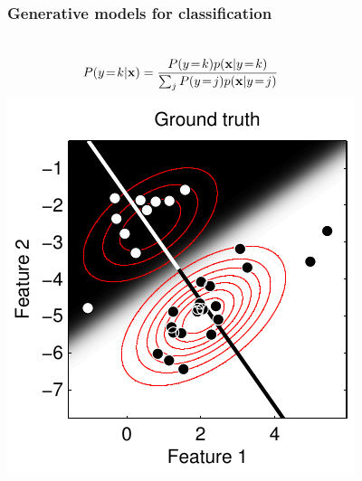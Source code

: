 
\begin{frame}
\frametitle{Generative models for classification}
\begin{columns}[c]
\begin{align*}
P(y\!=\!k|{\bf x}) = \frac{P(y\!=\!k) p({\bf x}|y\!=\!k)}{\sum_j P(y\!=\!j) p({\bf x}|y\!=\!j)}
\end{align*}
\includegraphics[width=\textwidth]{simple_ground_truth}
\end{columns}
\end{frame}

